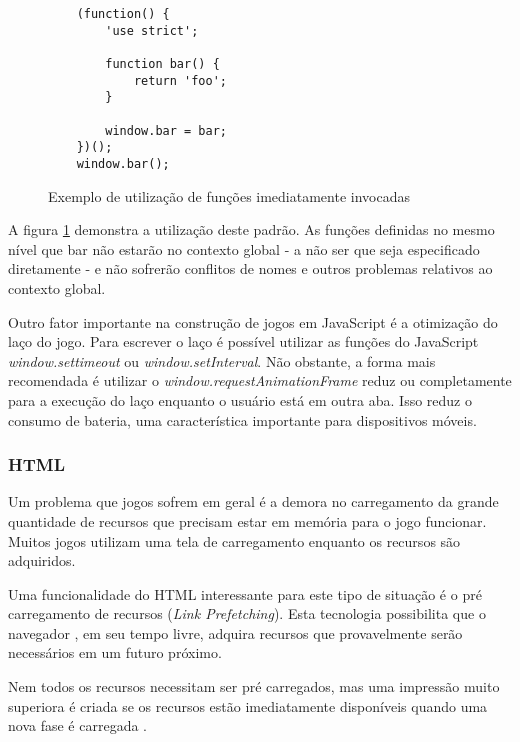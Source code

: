 \begin{figure}
\centering
\begin{verbatim}
    (function() {
        'use strict';

        function bar() {
            return 'foo';
        }

        window.bar = bar;
    })();
    window.bar();
\end{verbatim}
\caption{Exemplo de utilização de funções imediatamente invocadas}
\label{fig:iife}
\end{figure}

A figura \ref{fig:iife} demonstra a utilização deste padrão. As
funções definidas no mesmo nível que bar não estarão no contexto
global - a não ser que seja especificado diretamente - e não sofrerão
conflitos de nomes e outros problemas relativos ao contexto global.

Outro fator importante na construção de jogos em JavaScript é a
otimização do laço do jogo. Para escrever o laço é possível
utilizar as funções do JavaScript \textit{window.settimeout} ou
\textit{window.setInterval}. Não obstante, a forma mais recomendada é
utilizar o \textit{window.requestAnimationFrame} reduz ou completamente
para a execução do laço enquanto o usuário está em outra aba.
Isso reduz o consumo de bateria, uma característica importante para
dispositivos móveis.

\subsubsection{HTML}

Um problema que jogos sofrem em geral é a demora no carregamento da
grande quantidade de recursos que precisam estar em memória para o jogo
funcionar. Muitos jogos utilizam uma tela de carregamento enquanto os 
recursos são adquiridos.

Uma funcionalidade do HTML interessante para este tipo de situação
é o pré carregamento de recursos (\textit{Link Prefetching}). Esta
tecnologia possibilita que o navegador , em seu tempo livre, adquira
recursos que provavelmente serão necessários em um futuro próximo.

Nem todos os recursos necessitam ser pré carregados, mas uma impressão
muito superiora é criada se os recursos estão imediatamente
disponíveis quando uma nova fase é carregada \autocite[pp. 39]{creatingFun}.

